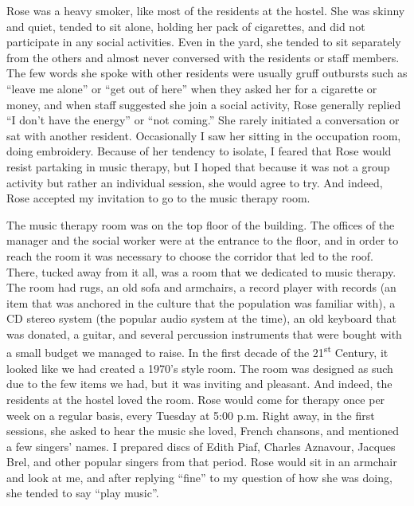 \documentclass[authordate, empirical, issue]{jote-new-article}
\begin{document}
Rose was a heavy smoker, like most of the residents at the hostel. She was skinny and quiet, tended to sit alone, holding her pack of cigarettes, and did not participate in any social activities. Even in the yard, she tended to sit separately from the others and almost never conversed with the residents or staff members. The few words she spoke with other residents were usually gruff outbursts such as “leave me alone” or “get out of here” when they asked her for a cigarette or money, and when staff suggested she join a social activity, Rose generally replied “I don't have the energy” or “not coming.” She rarely initiated a conversation or sat with another resident. Occasionally I saw her sitting in the occupation room, doing embroidery. Because of her tendency to isolate, I feared that Rose would resist partaking in music therapy, but I hoped that because it was not a group activity but rather an individual session, she would agree to try. And indeed, Rose accepted my invitation to go to the music therapy room.



The music therapy room was on the top floor of the building. The offices of the manager and the social worker were at the entrance to the floor, and in order to reach the room it was necessary to choose the corridor that led to the roof. There, tucked away from it all, was a room that we dedicated to music therapy. The room had rugs, an old sofa and armchairs, a record player with records (an item that was anchored in the culture that the population was familiar with), a CD stereo system (the popular audio system at the time), an old keyboard that was donated, a guitar, and several percussion instruments that were bought with a small budget we managed to raise. In the first decade of the 21\textsuperscript{st} Century, it looked like we had created a 1970's style room. The room was designed as such due to the few items we had, but it was inviting and pleasant. And indeed, the residents at the hostel loved the room. Rose would come for therapy once per week on a regular basis, every Tuesday at 5:00 p.m. Right away, in the first sessions, she asked to hear the music she loved, French chansons, and mentioned a few singers' names. I prepared discs of Edith Piaf, Charles Aznavour, Jacques Brel, and other popular singers from that period. Rose would sit in an armchair and look at me, and after replying “fine” to my question of how she was doing, she tended to say “play music”.
\end{document}
